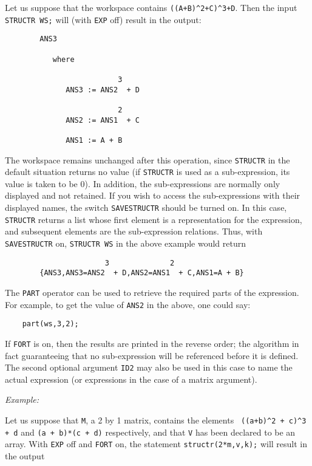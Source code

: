 Let us suppose that the workspace contains
{\tt ((A+B)\verb|^|2+C)\verb|^|3+D}.
Then the input {\tt STRUCTR WS;} will (with {\tt EXP} off) result in the
output:\newpage
\begin{verbatim}
        ANS3

           where

                          3
              ANS3 := ANS2  + D

                          2
              ANS2 := ANS1  + C

              ANS1 := A + B
\end{verbatim}
The workspace remains unchanged after this operation, since {\tt STRUCTR}
 in the default situation returns
no value (if {\tt STRUCTR} is used as a sub-expression, its value is taken
to be 0).  In addition, the sub-expressions are normally only displayed
and not retained. If you wish to access the sub-expressions with their
displayed names, the switch {\tt SAVESTRUCTR} should be
turned on.  In this case, {\tt STRUCTR} returns a list whose first element
is a representation for the expression, and subsequent elements are the
sub-expression relations.  Thus, with {\tt SAVESTRUCTR} on, {\tt STRUCTR WS}
in the above example would return
\vspace{-11pt}
\begin{verbatim}
                       3              2
        {ANS3,ANS3=ANS2  + D,ANS2=ANS1  + C,ANS1=A + B}
\end{verbatim}
The {\tt PART} operator can
be used to retrieve the required parts of the expression.  For example, to
get the value of {\tt ANS2} in the above, one could say:
\begin{verbatim}
	part(ws,3,2);
\end{verbatim}
If {\tt FORT} is on, then the results are printed in the reverse order; the
algorithm in fact guaranteeing that no sub-expression will be referenced
before it is defined.  The second optional argument {\tt ID2} may also be
used in this case to name the actual expression (or expressions in the
case of a matrix argument).

{\it Example:}

Let us suppose that {\tt M}, a 2 by 1 matrix, contains the elements {\tt
((a+b)\verb|^|2 + c)\verb|^|3 + d} and {\tt (a + b)*(c + d)} respectively,
and that {\tt V} has been declared to be an array.  With {\tt EXP} off and
{\tt FORT} on, the statement {\tt structr(2*m,v,k);} will result in the output

